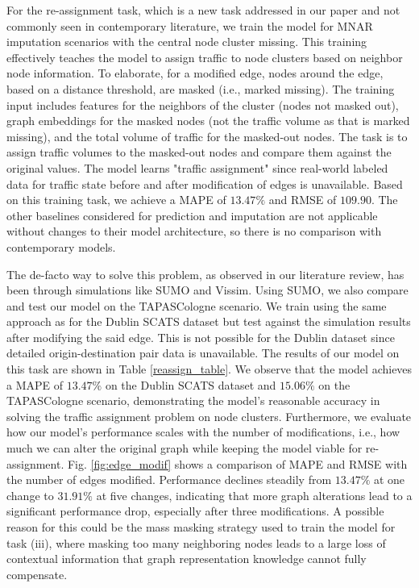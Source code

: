 For the re-assignment task, which is a new task addressed in our paper and not commonly seen in contemporary literature, we train the model for MNAR imputation scenarios with the central node cluster missing. This training effectively teaches the model to assign traffic to node clusters based on neighbor node information. To elaborate, for a modified edge, nodes around the edge, based on a distance threshold, are masked (i.e., marked missing). The training input includes features for the neighbors of the cluster (nodes not masked out), graph embeddings for the masked nodes (not the traffic volume as that is marked missing), and the total volume of traffic for the masked-out nodes. The task is to assign traffic volumes to the masked-out nodes and compare them against the original values. The model learns "traffic assignment" since real-world labeled data for traffic state before and after modification of edges is unavailable. Based on this training task, we achieve a MAPE of $13.47\%$ and RMSE of $109.90$. The other baselines considered for prediction and imputation are not applicable without changes to their model architecture, so there is no comparison with contemporary models.

The de-facto way to solve this problem, as observed in our literature review, has been through simulations like SUMO\cite{sumo} and Vissim\cite{vissim}. Using SUMO, we also compare and test our model on the TAPASCologne scenario. We train using the same approach as for the Dublin SCATS dataset but test against the simulation results after modifying the said edge. This is not possible for the Dublin dataset since detailed origin-destination pair data is unavailable. The results of our model on this task are shown in Table \ref{reassign_table}. We observe that the model achieves a MAPE of $13.47\%$ on the Dublin SCATS dataset and $15.06\%$ on the TAPASCologne scenario, demonstrating the model's reasonable accuracy in solving the traffic assignment problem on node clusters. Furthermore, we evaluate how our model's performance scales with the number of modifications, i.e., how much we can alter the original graph while keeping the model viable for re-assignment. Fig. \ref{fig:edge_modif} shows a comparison of MAPE and RMSE with the number of edges modified. Performance declines steadily from $13.47\%$ at one change to $31.91\%$ at five changes, indicating that more graph alterations lead to a significant performance drop, especially after three modifications. A possible reason for this could be the mass masking strategy used to train the model for task (iii), where masking too many neighboring nodes leads to a large loss of contextual information that graph representation knowledge cannot fully compensate.

